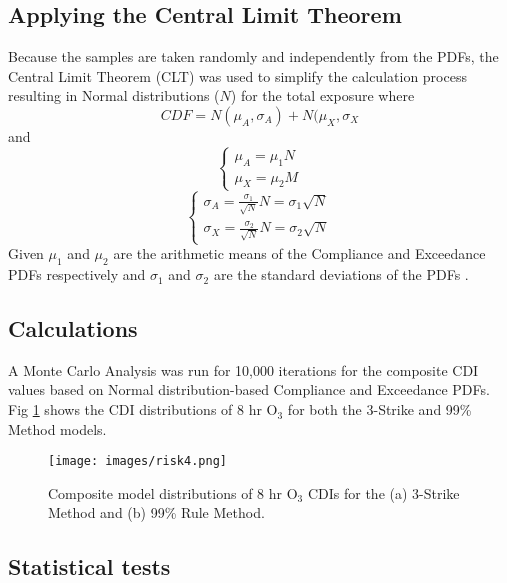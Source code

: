 \subsection{Applying the Central Limit Theorem}

Because the samples are taken randomly and independently from the PDFs, the Central Limit Theorem (CLT) was used to simplify the calculation process resulting in Normal distributions ($N$) for the total exposure where
%
\begin{equation}
\label{eq4:cdfN}
CDF=N(\mu_{A},\sigma_{A})+N(\mu_{X},\sigma_{X}
\end{equation}
%
\noindent
and
%
\begin{equation}
\label{eq5:cdfmu}
\left\{\begin{matrix}
\mu_{A} = \mu_{1}N
\\ 
\mu_{X} = \mu_{2}M
\end{matrix}\right.
\end{equation}
%
\begin{equation}
\label{eq6:cdfsigma}
\left\{\begin{matrix}
\sigma_{A} = \frac{\sigma_{1}}{\sqrt{N}}N = \sigma_{1}\sqrt{N}
\\ 
\sigma_{X} = \frac{\sigma_{2}}{\sqrt{N}}N = \sigma_{2}\sqrt{N}
\end{matrix}\right.
\end{equation}
%
Given $\mu_{1}$ and $\mu_{2}$ are the arithmetic means of the Compliance and Exceedance PDFs respectively and $\sigma_{1}$ and $\sigma_{2}$ are the standard deviations of the PDFs \citep{Ott1981}. 

\subsection{Calculations}

A Monte Carlo Analysis was run for 10,000 iterations for the composite CDI values based on Normal distribution-based Compliance and Exceedance PDFs.  Fig \ref{fig4:composite} shows the CDI distributions of 8 hr O$_{3}$ for both the 3-Strike and 99\% Method models. 
%  
\begin{figure}
\texttt{[image: images/risk4.png]} 
\caption{Composite model distributions of 8 hr O$_{3}$ CDIs for the (a) 3-Strike Method and (b) 99\% Rule Method.}
\label{fig4:composite}
\end{figure}
%

\subsection{Statistical tests}

